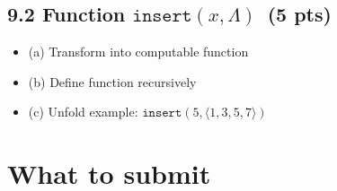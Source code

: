 \documentclass[11pt]{article}
\begin{document}
\subsection*{9.2 Function \(\texttt{insert}(x,\Lambda)\) \,(5 pts)}
\begin{itemize}
    \item (a) Transform into computable function
    \item (b) Define function recursively
    \item (c) Unfold example: \(\texttt{insert}(5,\langle 1,3,5,7\rangle)\)
\end{itemize}

\newpage
\section*{What to submit}
\end{document}
